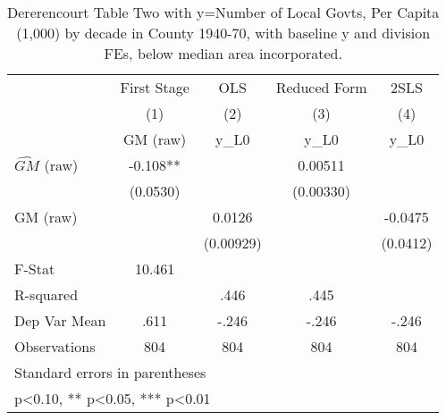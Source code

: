 \begin{table}[htbp]\centering
\def\sym#1{\ifmmode^{#1}\else\(^{#1}\)\fi}
\caption{Dererencourt Table Two with y=Number of Local Govts, Per Capita (1,000) by decade in County 1940-70, with baseline y and division FEs, below median area incorporated.}
\begin{tabular}{l*{4}{c}}
\toprule
                    & First Stage   &         OLS   &Reduced Form   &        2SLS   \\
                    &\multicolumn{1}{c}{(1)}&\multicolumn{1}{c}{(2)}&\multicolumn{1}{c}{(3)}&\multicolumn{1}{c}{(4)}\\
                    &\multicolumn{1}{c}{GM  (raw)}&\multicolumn{1}{c}{y\_L0}&\multicolumn{1}{c}{y\_L0}&\multicolumn{1}{c}{y\_L0}\\
\midrule
$\hat{GM}$ (raw)    &      -0.108** &               &     0.00511   &               \\
                    &    (0.0530)   &               &   (0.00330)   &               \\
\addlinespace
GM  (raw)           &               &      0.0126   &               &     -0.0475   \\
                    &               &   (0.00929)   &               &    (0.0412)   \\
\midrule
F-Stat              &      10.461   &               &               &               \\
R-squared           &               &        .446   &        .445   &               \\
Dep Var Mean        &        .611   &       -.246   &       -.246   &       -.246   \\
Observations        &         804   &         804   &         804   &         804   \\
\bottomrule
\multicolumn{5}{l}{\footnotesize Standard errors in parentheses}\\
\multicolumn{5}{l}{\footnotesize * p<0.10, ** p<0.05, *** p<0.01}\\
\end{tabular}
\end{table}
